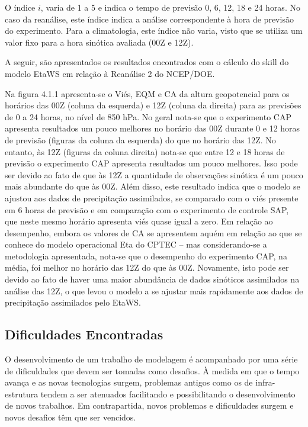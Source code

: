 O índice $i$, varia de 1 a 5 e indica o tempo de previsão 0, 6, 12, 18 e 24 horas. No caso da reanálise, este índice indica a análise correspondente à hora de previsão do experimento. Para a climatologia, este índice não varia, visto que se utiliza um valor fixo para a hora sinótica avaliada (00Z e 12Z).

A seguir, são apresentados os resultados encontrados com o cálculo do skill do modelo EtaWS em relação à Reanálise 2 do NCEP/DOE.

Na figura 4.1.1 apresenta-se o Viés, EQM e CA da altura geopotencial para os horários das 00Z (coluna da esquerda) e 12Z (coluna da direita) para as previsões de 0 a 24 horas, no nível de 850 hPa. No geral nota-se que o experimento CAP apresenta resultados um pouco melhores no horário das 00Z durante 0 e 12 horas de previsão (figuras da coluna da esquerda) do que no horário das 12Z. No entanto, às 12Z (figuras da coluna direita) nota-se que entre 12 e 18 horas de previsão o experimento CAP apresenta resultados um pouco melhores. Isso pode ser devido ao fato de que às 12Z a quantidade de observações sinótica é um pouco mais abundante do que às 00Z. Além disso, este resultado indica que o modelo se ajustou aos dados de precipitação assimilados, se comparado com o viés presente em 6 horas de previsão e em comparação com o experimento de controle SAP, que neste mesmo horário apresenta viés quase igual a zero. Em relação ao desempenho, embora os valores de CA se apresentem aquém em relação ao que se conhece do modelo operacional Eta do CPTEC – mas considerando-se a metodologia apresentada, nota-se que o desempenho do experimento CAP, na média, foi melhor no horário das 12Z do que às 00Z. Novamente, isto pode ser devido ao fato de haver uma maior abundância de dados sinóticos assimilados na análise das 12Z, o que levou o modelo a se ajustar mais rapidamente aos dados de precipitação assimilados pelo EtaWS.




\subsection{Dificuldades Encontradas}

O desenvolvimento de um trabalho de modelagem é acompanhado por uma série de dificuldades que devem ser tomadas como desafios. À medida em que o tempo avança e as novas tecnologias surgem, problemas antigos como os de infra-estrutura tendem a ser atenuados facilitando e possibilitando o desenvolvimento de novos trabalhos. Em contrapartida, novos problemas e dificuldades surgem e novos desafios têm que ser vencidos.

